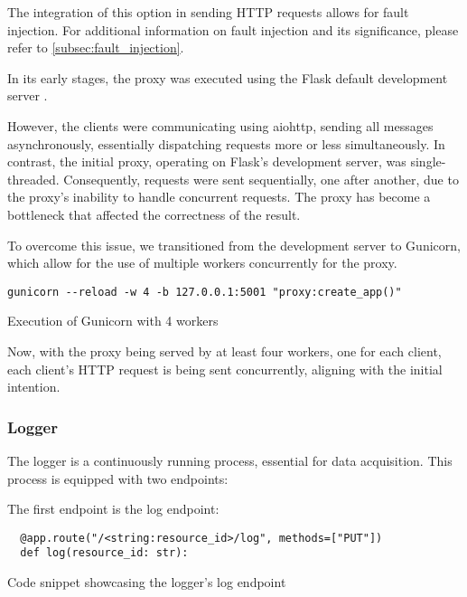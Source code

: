 The integration of this option in sending HTTP requests allows for fault injection. For additional information on fault injection and its significance, please refer to \ref{subsec:fault_injection}.

In its early stages, the proxy was executed using the Flask default development server \cite{flask_dev_server}.

However, the clients were communicating using aiohttp, sending all messages asynchronously, essentially dispatching requests more or less simultaneously. 
In contrast, the initial proxy, operating on Flask's development server, was single-threaded. 
Consequently, requests were sent sequentially, one after another, due to the proxy's inability to handle concurrent requests. 
The proxy has become a bottleneck that affected the correctness of the result.

To overcome this issue, we transitioned from the development server to Gunicorn,
which allow for the use of multiple workers concurrently for the proxy.

\begin{listing}[!ht]
  \begin{verbatim}
gunicorn --reload -w 4 -b 127.0.0.1:5001 "proxy:create_app()"
  \end{verbatim}
  \caption{Execution of Gunicorn with 4 workers}
\end{listing}

Now, with the proxy being served by at least four workers, one for each client, 
each client's HTTP request is being sent concurrently, aligning with the initial intention.

\subsubsection{Logger}

The logger is a continuously running process, essential for data acquisition. This process is equipped with two endpoints:

The first endpoint is the log endpoint:

\begin{listing}[H]
  \begin{verbatim}
  @app.route("/<string:resource_id>/log", methods=["PUT"])
  def log(resource_id: str):
  \end{verbatim}
  \caption{Code snippet showcasing the logger's log endpoint}
  \label{code:logger_log}
\end{listing}

